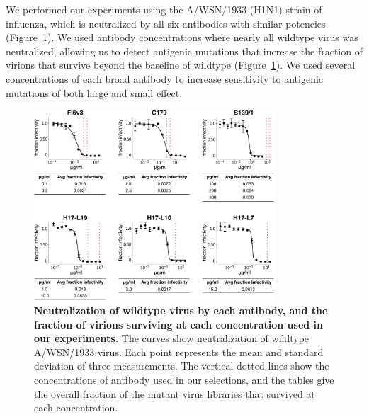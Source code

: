 \documentclass[11pt]{article}
\begin{document}
We performed our experiments using the A/WSN/1933 (H1N1) strain of influenza, which is neutralized by all six antibodies with similar potencies (Figure~\ref{fig:neutcurves}).
We used antibody concentrations where nearly all wildtype virus was neutralized, allowing us to detect antigenic mutations that increase the fraction of virions that survive beyond the baseline of wildtype (Figure~\ref{fig:neutcurves}). 
We used several concentrations of each broad antibody to increase sensitivity to antigenic mutations of both large and small effect.

\begin{figure}
\centerline{\includegraphics[width=0.8\textwidth]{figs/neutralization_curves/WT_neutralization_curves.pdf}}
\caption{\label{fig:neutcurves}
{\bf Neutralization of wildtype virus by each antibody, and the fraction of virions surviving at each concentration used in our experiments.}
The curves show neutralization of wildtype A/WSN/1933 virus. 
Each point represents the mean and standard deviation of three measurements. 
The vertical dotted lines show the concentrations of antibody used in our selections, and the tables give the overall fraction of the mutant virus libraries that survived at each concentration.
}
\end{figure}
\end{document}

